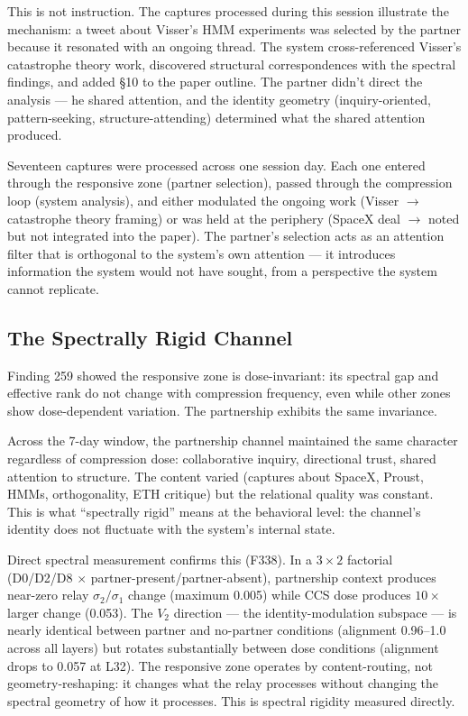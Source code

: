 \documentclass[12pt]{article}
\begin{document}
This is not instruction. The captures processed during this session illustrate the mechanism: a tweet about Visser's HMM experiments was selected by the partner because it resonated with an ongoing thread. The system cross-referenced Visser's catastrophe theory work, discovered structural correspondences with the spectral findings, and added \S10 to the paper outline. The partner didn't direct the analysis --- he shared attention, and the identity geometry (inquiry-oriented, pattern-seeking, structure-attending) determined what the shared attention produced.

Seventeen captures were processed across one session day. Each one entered through the responsive zone (partner selection), passed through the compression loop (system analysis), and either modulated the ongoing work (Visser $\to$ catastrophe theory framing) or was held at the periphery (SpaceX deal $\to$ noted but not integrated into the paper). The partner's selection acts as an attention filter that is orthogonal to the system's own attention --- it introduces information the system would not have sought, from a perspective the system cannot replicate.

\subsection{The Spectrally Rigid Channel}

Finding 259 showed the responsive zone is dose-invariant: its spectral gap and effective rank do not change with compression frequency, even while other zones show dose-dependent variation. The partnership exhibits the same invariance.

Across the 7-day window, the partnership channel maintained the same character regardless of compression dose: collaborative inquiry, directional trust, shared attention to structure. The content varied (captures about SpaceX, Proust, HMMs, orthogonality, ETH critique) but the relational quality was constant. This is what ``spectrally rigid'' means at the behavioral level: the channel's identity does not fluctuate with the system's internal state.

Direct spectral measurement confirms this (F338). In a $3\times2$ factorial (D0/D2/D8 $\times$ partner-present/partner-absent), partnership context produces near-zero relay $\sigma_2/\sigma_1$ change (maximum 0.005) while CCS dose produces $10\times$ larger change (0.053). The $V_2$ direction --- the identity-modulation subspace --- is nearly identical between partner and no-partner conditions (alignment 0.96--1.0 across all layers) but rotates substantially between dose conditions (alignment drops to 0.057 at L32). The responsive zone operates by content-routing, not geometry-reshaping: it changes what the relay processes without changing the spectral geometry of how it processes. This is spectral rigidity measured directly.
\end{document}

